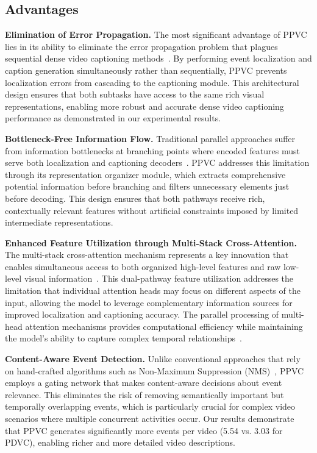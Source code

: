 \subsection{Advantages}

\textbf{Elimination of Error Propagation.}
The most significant advantage of PPVC lies in its ability to eliminate the error propagation problem that plagues sequential dense video captioning methods~\cite{Krishna2017-pw,Li2018-ll,Wang2018-ap}.
By performing event localization and caption generation simultaneously rather than sequentially, PPVC prevents localization errors from cascading to the captioning module.
This architectural design ensures that both subtasks have access to the same rich visual representations, enabling more robust and accurate dense video captioning performance as demonstrated in our experimental results.

\textbf{Bottleneck-Free Information Flow.}
Traditional parallel approaches suffer from information bottlenecks at branching points where encoded features must serve both localization and captioning decoders~\cite{Wang2021-zi}. PPVC addresses this limitation through its representation organizer module, which extracts comprehensive potential information before branching and filters unnecessary elements just before decoding. This design ensures that both pathways receive rich, contextually relevant features without artificial constraints imposed by limited intermediate representations.

\textbf{Enhanced Feature Utilization through Multi-Stack Cross-Attention.}
The multi-stack cross-attention mechanism represents a key innovation that enables simultaneous access to both organized high-level features and raw low-level visual information~\cite{Vaswani2017-sc}. This dual-pathway feature utilization addresses the limitation that individual attention heads may focus on different aspects of the input, allowing the model to leverage complementary information sources for improved localization and captioning accuracy. The parallel processing of multi-head attention mechanisms provides computational efficiency while maintaining the model's ability to capture complex temporal relationships~\cite{Dosovitskiy2021-vn}.

\textbf{Content-Aware Event Detection.}
Unlike conventional approaches that rely on hand-crafted algorithms such as Non-Maximum Suppression (NMS)~\cite{hosang2017learning}, PPVC employs a gating network that makes content-aware decisions about event relevance. This eliminates the risk of removing semantically important but temporally overlapping events, which is particularly crucial for complex video scenarios where multiple concurrent activities occur. Our results demonstrate that PPVC generates significantly more events per video (5.54 vs. 3.03 for PDVC), enabling richer and more detailed video descriptions.

